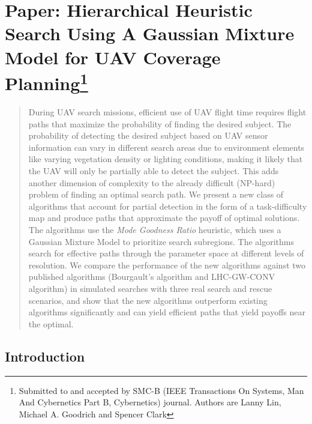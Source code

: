 \chapter[Paper: Hierarchical Heuristic Search Using A Gaussian Mixture Model for UAV Coverage Planning]{Paper: Hierarchical Heuristic Search Using A Gaussian Mixture Model for UAV Coverage Planning\footnote {Submitted to and accepted by SMC-B (IEEE Transactions On Systems, Man And Cybernetics Part B, Cybernetics) journal. Authors are Lanny Lin, Michael A. Goodrich and Spencer Clark}}
\label{chap:SMCB2014}

\begin{abstract}
During UAV search missions, efficient use of UAV flight time requires flight paths that maximize the probability of finding the desired subject. The probability of detecting the desired subject based on UAV sensor information can vary in different search areas due to environment elements like varying vegetation density or lighting conditions, making it likely that the UAV will only be partially able to detect the subject. This adds another dimension of complexity to the already difficult (NP-hard) problem of finding an optimal search path. We present a new class of algorithms that account for partial detection in the form of a task-difficulty map and produce paths that approximate the payoff of optimal solutions. The algorithms use the \textit{Mode Goodness Ratio} heuristic, which uses a Gaussian Mixture Model to prioritize search subregions. The algorithms search for effective paths through the parameter space at different levels of resolution. We compare the performance of the new algorithms against two published algorithms (Bourgault's algorithm and LHC-GW-CONV algorithm) in simulated searches with three real search and rescue scenarios, and show that the new algorithms outperform existing algorithms significantly and can yield efficient paths that yield payoffs near the optimal.  
\end{abstract}


%

\section{Introduction}
\label{sec:Introduction}

